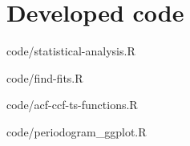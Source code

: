 \section{Developed code}\label{app:code}
\renewcommand{\lstlistingname}{Script}

%
	{code/statistical-analysis.R}

%
	{code/find-fits.R}
	
%
	{code/acf-ccf-ts-functions.R}
	
%
	{code/periodogram_ggplot.R}